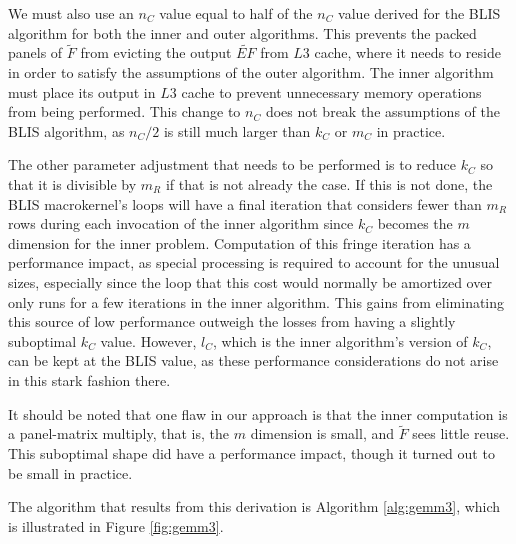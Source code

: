 \documentclass[12pt]{article}
\begin{document}
We must also use an $n_C$ value equal to half of the $n_C$ value derived for the BLIS algorithm for both the inner and outer algorithms.
This prevents the packed panels of $\widetilde{F}$ from evicting the output $\widetilde{EF}$ from $L3$ cache, where it needs to reside in order to satisfy the assumptions of the outer algorithm.
The inner algorithm must place its output in $L3$ cache to prevent unnecessary memory operations from being performed.
This change to $n_C$ does not  break the assumptions of the BLIS algorithm, as $n_C/2$ is still much larger than $k_C$ or $m_C$ in practice.

The other parameter adjustment that needs to be performed is to reduce $k_C$ so that it is divisible by $m_R$ if that is not already the case.
If this is not done, the BLIS macrokernel's loops will have a final iteration that considers fewer than $m_R$ rows during each invocation of the inner algorithm since $k_C$ becomes the $m$ dimension for the inner problem.
Computation of this fringe iteration has a performance impact, as special processing is required to account for the unusual sizes, especially since the loop that this cost would normally be amortized over only runs for a few iterations in the inner algorithm.
This gains from eliminating this source of low performance outweigh the losses from having a slightly suboptimal $k_C$ value.
However, $l_C$, which is the inner algorithm's version of $k_C$, can be kept at the BLIS value, as these performance considerations do not arise in this stark fashion there.

It should be noted that one flaw in our approach is that the inner computation is a panel-matrix multiply, that is, the $m$ dimension is small, and $\widetilde{F}$ sees little reuse.
This suboptimal shape did have a performance impact, though it turned out to be small in practice.

The algorithm that results from this derivation is Algorithm \ref{alg:gemm3}, which is illustrated in Figure \ref{fig:gemm3}.
\end{document}
